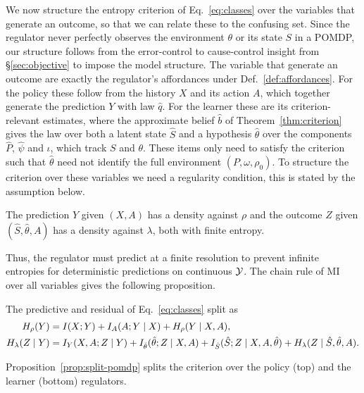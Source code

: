 We now structure the entropy criterion of Eq.~\eqref{eq:classes} over the variables that generate an outcome, so that we can relate these to the confusing set.
Since the regulator never perfectly observes the environment $\theta$ or its state $S$ in a POMDP, our structure follows from the error-control to cause-control insight from \S\ref{sec:objective} to impose the model structure.
The variable that generate an outcome are exactly the regulator's affordances under Def.~\ref{def:affordances}.
For the policy these follow from the history $X$ and its action $A$, which together generate the prediction $Y$ with law $\hat q$.
For the learner these are its criterion-relevant estimates, where the approximate belief $\hat b$ of Theorem~\ref{thm:criterion} gives the law over both a latent state $\hat S$ and a hypothesis $\hat\theta$ over the components $\hat P$, $\hat\psi$ and $\iota$, which track $S$ and $\theta$.
These items only need to satisfy the criterion such that $\hat\theta$ need not identify the full environment $(P, \omega, \rho_0)$.
To structure the criterion over these variables we need a regularity condition, this is stated by the assumption below.
\begin{assumption}
    \label{ass:kernel}
    The prediction $Y$ given $(X,A)$ has a density against $\rho$ and the outcome $Z$ given $(\hat S, \hat\theta, A)$ has a density against $\lambda$, both with finite entropy.
\end{assumption}
Thus, the regulator must predict at a finite resolution to prevent infinite entropies for deterministic predictions on continuous $\mathcal Y$.
The chain rule of MI over all variables gives the following proposition.
\begin{proposition}
    \label{prop:split-pomdp}
    The predictive and residual of Eq.~\eqref{eq:classes} split as
    \begin{equation} \label{eq:split-pomdp}
    \setlength{\belowdisplayskip}{0pt}
    \begin{aligned}
      H_\rho(Y) &= I(X;Y) + I_A(A;Y \mid X) + H_\rho(Y \mid X,A), \\
      H_\lambda(Z \mid Y) &= I_Y(X,A;Z \mid Y) + I_{\hat\theta}(\hat\theta;Z \mid X,A) + I_{\hat S}(\hat S;Z \mid X,A,\hat\theta) + H_\lambda(Z \mid \hat S,\hat\theta,A).
    \end{aligned}
    \end{equation}
\end{proposition}
Proposition~\ref{prop:split-pomdp} splits the criterion over the policy (top) and the learner (bottom) regulators.
